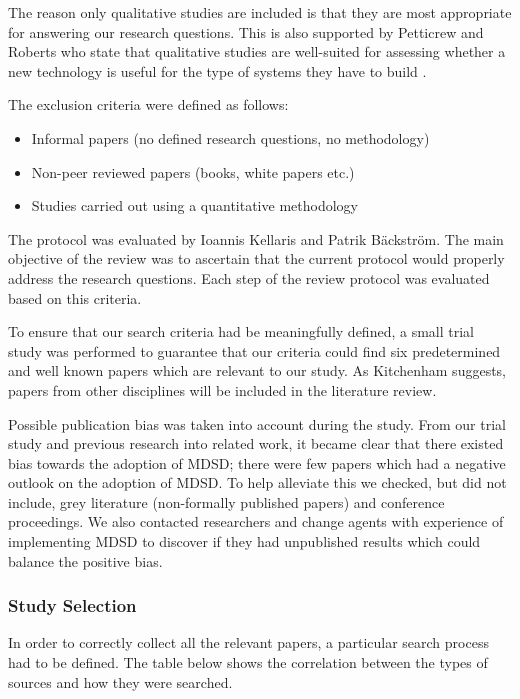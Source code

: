 \documentclass[10pt,twocolumn]{article}
\begin{document}
The reason only qualitative studies are included is that they are most appropriate for answering our research questions. This is also supported by Petticrew and Roberts who state that qualitative studies are well-suited for assessing whether a new technology is useful for the type of systems they have to build \cite{petticrew2008systematic}.  
\newline

The exclusion criteria were defined as follows: 
\begin{itemize}
\item Informal papers (no defined research questions, no methodology)
\item Non-peer reviewed papers (books, white papers etc.)
\item Studies carried out using a quantitative methodology
\end{itemize} 

The protocol was evaluated by Ioannis Kellaris and Patrik B\"ackstr\"om. The main objective of the review was to ascertain that the current protocol would properly address the research questions. Each step of the review protocol was evaluated based on this criteria. 


To ensure that our search criteria had be meaningfully defined, a small trial study was performed to guarantee that our criteria could find six predetermined and well known papers which are relevant to our study. As Kitchenham \cite{kitchenham2007guidelines} suggests, papers from other disciplines will be included in the literature review. 

Possible publication bias was taken into account during the study. From our trial study and previous research into related work, it became clear that there existed bias towards the adoption of MDSD; there were few papers which had a negative outlook on the adoption of MDSD. To help alleviate this we checked, but did not include, grey literature (non-formally published papers) and conference proceedings. We also contacted researchers and change agents with experience of implementing MDSD to discover if they had unpublished results which could balance the positive bias. 

\subsubsection{Study Selection}

In order to correctly collect all the relevant papers, a particular search process had to be defined. The table below shows the correlation between the types of sources and how they were searched.
\end{document}
